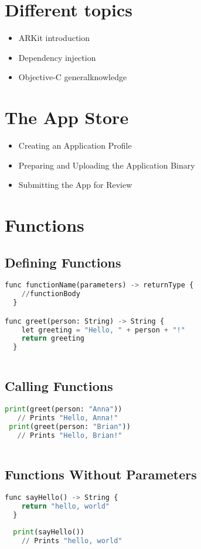 \documentclass[14pt]{extarticle}
\begin{document}
\section{Different topics}
\begin{itemize}
	\item ARKit introduction
	\item Dependency injection
	\item Objective-C generalknowledge
\end{itemize}

\section{The App Store}
\begin{itemize}
	\item Creating an Application Profile
	\item Preparing and Uploading the Application Binary
	\item Submitting the App for Review
\end{itemize}


\section{Functions}



\subsection{Defining Functions}
\begin{lstlisting}[language=python]
func functionName(parameters) -> returnType { 
	//functionBody 
  }

func greet(person: String) -> String { 
	let greeting = "Hello, " + person + "!"
	return greeting
  }
	
\end{lstlisting}



\subsection{Calling Functions}
\begin{lstlisting}[language=python]
 print(greet(person: "Anna")) 
   // Prints "Hello, Anna!"
 print(greet(person: "Brian")) 
   // Prints "Hello, Brian!"
	
\end{lstlisting}

\subsection{Functions Without Parameters}
\begin{lstlisting}[language=python]
  func sayHello() -> String { 
	return "hello, world"
  } 
	
  print(sayHello()) 
    // Prints "hello, world"
\end{lstlisting}
\end{document}
